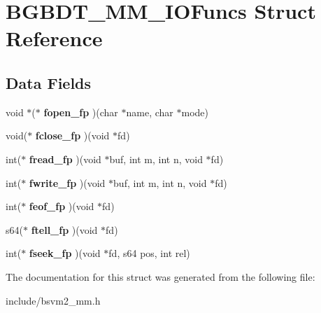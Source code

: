 \hypertarget{structBGBDT__MM__IOFuncs}{\section{B\-G\-B\-D\-T\-\_\-\-M\-M\-\_\-\-I\-O\-Funcs Struct Reference}
\label{structBGBDT__MM__IOFuncs}
}
\subsection*{Data Fields}
\begin{DoxyCompactItemize}
\item 
\hypertarget{structBGBDT__MM__IOFuncs_a8ca361b84226fa39a422dc0afea9b53d}{void $\ast$($\ast$ {\bfseries fopen\-\_\-fp} )(char $\ast$name, char $\ast$mode)}\label{structBGBDT__MM__IOFuncs_a8ca361b84226fa39a422dc0afea9b53d}

\item 
\hypertarget{structBGBDT__MM__IOFuncs_a97dcb273279bd13b3e90b9db8743a066}{void($\ast$ {\bfseries fclose\-\_\-fp} )(void $\ast$fd)}\label{structBGBDT__MM__IOFuncs_a97dcb273279bd13b3e90b9db8743a066}

\item 
\hypertarget{structBGBDT__MM__IOFuncs_ae08f9c959c3c55635e988c8541ccf395}{int($\ast$ {\bfseries fread\-\_\-fp} )(void $\ast$buf, int m, int n, void $\ast$fd)}\label{structBGBDT__MM__IOFuncs_ae08f9c959c3c55635e988c8541ccf395}

\item 
\hypertarget{structBGBDT__MM__IOFuncs_a32d833b5dd770143e1900c129e595702}{int($\ast$ {\bfseries fwrite\-\_\-fp} )(void $\ast$buf, int m, int n, void $\ast$fd)}\label{structBGBDT__MM__IOFuncs_a32d833b5dd770143e1900c129e595702}

\item 
\hypertarget{structBGBDT__MM__IOFuncs_ad001d1c9e971c48e6129bc9831349a7e}{int($\ast$ {\bfseries feof\-\_\-fp} )(void $\ast$fd)}\label{structBGBDT__MM__IOFuncs_ad001d1c9e971c48e6129bc9831349a7e}

\item 
\hypertarget{structBGBDT__MM__IOFuncs_aa3a69c9d69dc4eded0e41253621211f8}{s64($\ast$ {\bfseries ftell\-\_\-fp} )(void $\ast$fd)}\label{structBGBDT__MM__IOFuncs_aa3a69c9d69dc4eded0e41253621211f8}

\item 
\hypertarget{structBGBDT__MM__IOFuncs_af6b8631386bcb2786a4a61027d1d5c72}{int($\ast$ {\bfseries fseek\-\_\-fp} )(void $\ast$fd, s64 pos, int rel)}\label{structBGBDT__MM__IOFuncs_af6b8631386bcb2786a4a61027d1d5c72}

\end{DoxyCompactItemize}


The documentation for this struct was generated from the following file\-:\begin{DoxyCompactItemize}
\item 
include/bsvm2\-\_\-mm.\-h\end{DoxyCompactItemize}
